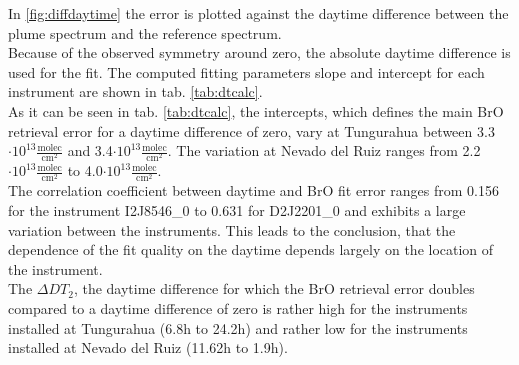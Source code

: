 In \cref{fig:diffdaytime} the  error is plotted against the daytime difference between the plume spectrum and the reference spectrum.  \\
Because of the observed symmetry around zero, the absolute daytime difference is used for the fit. The computed fitting parameters slope and intercept for each instrument are shown in tab. \ref{tab:dtcalc}. \\
%
As it can be seen in tab. \ref{tab:dtcalc}, the intercepts, which defines the main BrO retrieval error for a daytime difference of zero, vary at Tungurahua between 3.3$\cdot10^{13}\frac{\text{molec}}{\text{cm}^2}$ and 3.4$\cdot10^{13}\frac{\text{molec}}{\text{cm}^2}$. The variation at Nevado del Ruiz ranges from  2.2$\cdot10^{13}\frac{\text{molec}}{\text{cm}^2}$ to 4.0$\cdot10^{13}\frac{\text{molec}}{\text{cm}^2}$. \\
The correlation coefficient between daytime and BrO fit error ranges from 0.156 for the instrument I2J8546\_0  to  0.631 for D2J2201\_0 and exhibits a large variation between the instruments. This leads to the conclusion, that the dependence of the fit quality on the daytime depends largely on the location of the instrument.\\
The $\Delta DT_{2}$, the daytime difference for which the BrO retrieval error doubles compared to a daytime difference of zero is rather high for the instruments installed at Tungurahua (6.8h to 24.2h) and rather low for the instruments installed at Nevado del Ruiz (11.62h to 1.9h).

